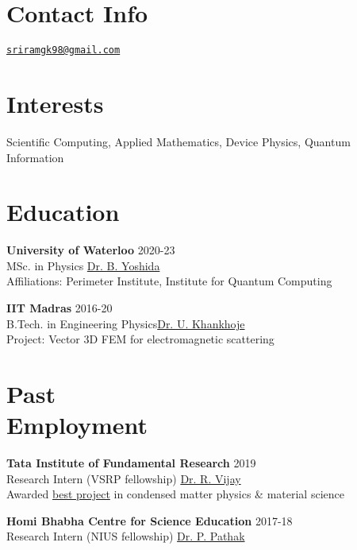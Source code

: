 \documentclass[margin,line]{res}
\begin{document}

\begin{resume}
\section{\sc Contact Info}
\href{mailto:sriramgk98@gmail.com}{\texttt{sriramgk98@gmail.com}}

\section{\sc Interests}
Scientific Computing, Applied Mathematics, Device Physics, Quantum Information

\section{\sc Education}
{\bf University of Waterloo} \hfill 2020-23\\
MSc. in Physics \hfill  \href{https://perimeterinstitute.ca/people/beni-yoshida}{\sffamily Dr. B. Yoshida}\\
Affiliations: Perimeter Institute, Institute for Quantum Computing

{\bf IIT Madras} \hfill 2016-20 \\
B.Tech. in Engineering Physics\hfill  \href{http://www.ee.iitm.ac.in/uday/index.html}{\sffamily Dr. U. Khankhoje}\\
Project: Vector 3D FEM for electromagnetic scattering

\section{\sc Past\\Employment}
{\bf Tata Institute of Fundamental Research} \hfill 2019\\
Research Intern (VSRP fellowship) \hfill \href{https://www.tifr.res.in/~quantro/people.html}{\sffamily Dr. R. Vijay}\\
Awarded \href{https://sriramgkn.github.io/docs/vsrp_awardcertificate.pdf}{\sffamily best project} in condensed matter physics \& material science

{\bf Homi Bhabha Centre for Science Education} \hfill 2017-18\\
Research Intern (NIUS fellowship) \hfill \href{https://www.hbcse.tifr.res.in/people/scientific/praveen-p-pathak}{\sffamily Dr. P. Pathak}


\end{resume}
\end{document}
